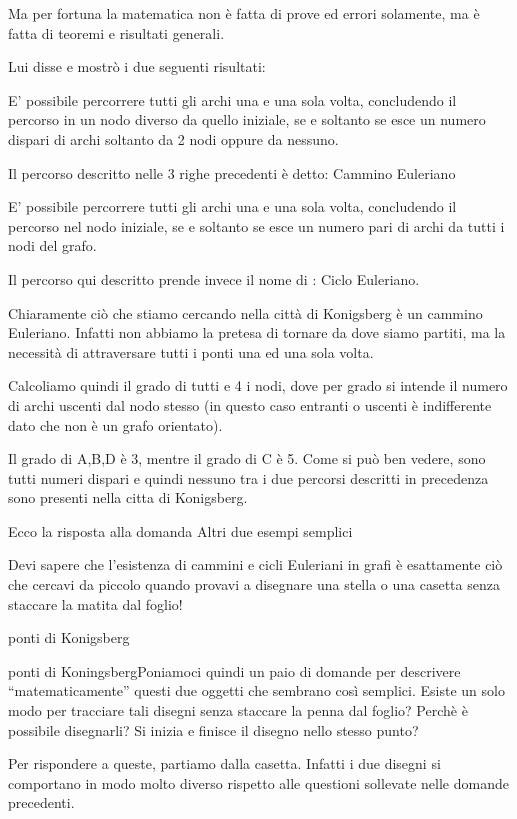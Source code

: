Ma per fortuna la matematica non è fatta di prove ed errori solamente, ma è fatta di teoremi e risultati generali.

Lui disse e mostrò i due seguenti risultati:

    E’ possibile percorrere tutti gli archi una e una sola volta, concludendo il percorso in un nodo diverso da quello iniziale, se e soltanto se esce un numero dispari di archi soltanto da 2 nodi oppure da nessuno.

Il percorso descritto nelle 3 righe precedenti è detto: Cammino Euleriano

    E’ possibile percorrere tutti gli archi una e una sola volta, concludendo il percorso nel nodo iniziale, se e soltanto se esce un numero pari di archi da tutti i nodi del grafo.

Il percorso qui descritto prende invece il nome di : Ciclo Euleriano.

Chiaramente ciò che stiamo cercando nella città di Konigsberg è un cammino Euleriano. Infatti non abbiamo la pretesa di tornare da dove siamo partiti, ma la necessità di attraversare tutti i ponti una ed una sola volta.

Calcoliamo quindi il grado di tutti e 4 i nodi, dove per grado si intende il numero di archi uscenti dal nodo stesso (in questo caso entranti o uscenti è indifferente dato che non è un grafo orientato).

Il grado di A,B,D è 3, mentre il grado di C è 5. Come si può ben vedere, sono tutti numeri dispari e quindi nessuno tra i due percorsi descritti in precedenza sono presenti nella citta di Konigsberg.

Ecco la risposta alla domanda
Altri due esempi semplici

Devi sapere che l’esistenza di cammini e cicli Euleriani in grafi è esattamente ciò che cercavi da piccolo quando provavi a disegnare una stella o una casetta senza staccare la matita dal foglio!

ponti di Konigsberg

ponti di KoningsbergPoniamoci quindi un paio di domande per descrivere “matematicamente” questi due oggetti che sembrano così semplici. Esiste un solo modo per tracciare tali disegni senza staccare la penna dal foglio? Perchè è possibile disegnarli? Si inizia e finisce il disegno nello stesso punto?

Per rispondere a queste, partiamo dalla casetta. Infatti i due disegni si comportano in modo molto diverso rispetto alle questioni sollevate nelle domande precedenti.

